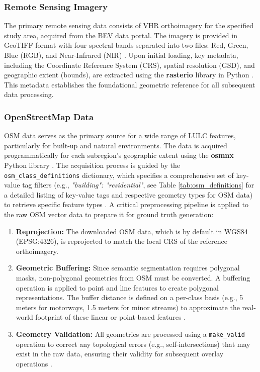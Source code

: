 \documentclass{report}
\begin{document}
\subsubsection{Remote Sensing Imagery}
The primary remote sensing data consists of VHR orthoimagery for the specified study area, acquired from the BEV data portal. The imagery is provided in GeoTIFF format with four spectral bands separated into two files: Red, Green, Blue (RGB), and Near-Infrared (NIR) \parencite{BundesamtfurEich-undVermessungswesenOrthophotoFarbe2025}. Upon initial loading, key metadata, including the Coordinate Reference System (CRS), spatial resolution (GSD), and geographic extent (bounds), are extracted using the \textbf{rasterio} library in Python \parencite{GilliesRasteriogeospatialrasterPythonprogrammers2013}. This metadata establishes the foundational geometric reference for all subsequent data processing. \par
\subsubsection{OpenStreetMap Data}
OSM data serves as the primary source for a wide range of LULC features, particularly for built-up and natural environments. The data is acquired programmatically for each subregion's geographic extent using the \textbf{osmnx} Python library \parencite{BoeingModelingAnalyzingUrbanNetworksAmenitiesOSMnx2025}. The acquisition process is guided by the \texttt{osm\_class\_definitions} dictionary, which specifies a comprehensive set of key-value tag filters (e.g., \textit{{"building": "residential"}}, see Table \ref{tab:osm_definitions} for a detailed listing of key-value tags and respective geometry types for OSM data) to retrieve specific feature types  \parencite{OpenStreetMapcontributorsOpenStreetMap2025}.
A critical preprocessing pipeline is applied to the raw OSM vector data to prepare it for ground truth generation:
\begin{enumerate}
    \item \textbf{Reprojection:} The downloaded OSM data, which is by default in WGS84 (EPSG:4326), is reprojected to match the local CRS of the reference orthoimagery.
    \item \textbf{Geometric Buffering:} Since semantic segmentation requires polygonal masks, non-polygonal geometries from OSM must be converted. A buffering operation is applied to point and line features to create polygonal representations. The buffer distance is defined on a per-class basis (e.g., 5 meters for motorways, 1.5 meters for minor streams) to approximate the real-world footprint of these linear or point-based features \parencite{JordahlEtAlgeopandasgeopandasv0812020}.
    \item \textbf{Geometry Validation:} All geometries are processed using a \texttt{make\_valid} operation to correct any topological errors (e.g., self-intersections) that may exist in the raw data, ensuring their validity for subsequent overlay operations \parencite{JordahlEtAlgeopandasgeopandasv0812020}.
\end{enumerate}
\par
\end{document}
